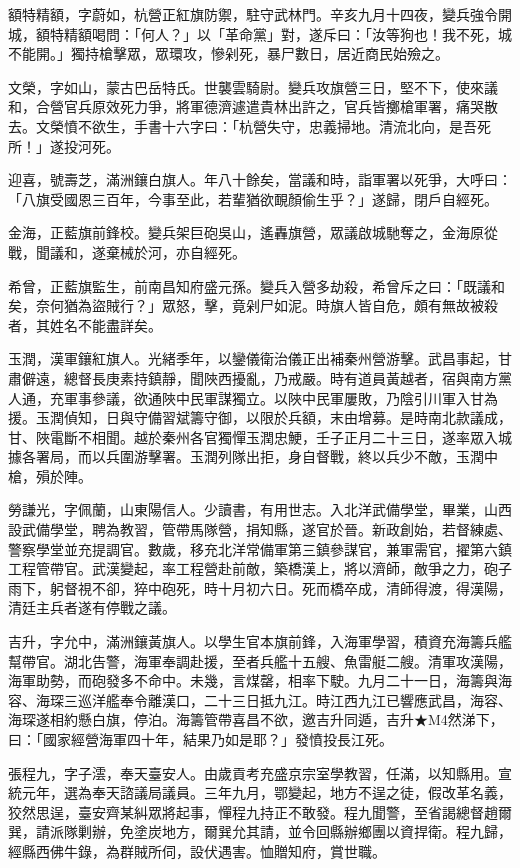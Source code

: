 \begin{pinyinscope}
額特精額，字蔚如，杭營正紅旗防禦，駐守武林門。辛亥九月十四夜，變兵強令開城，額特精額喝問：「何人？」以「革命黨」對，遂斥曰：「汝等狗也！我不死，城不能開。」獨持槍擊眾，眾環攻，慘剁死，暴尸數日，居近商民始殮之。

文榮，字如山，蒙古巴岳特氏。世襲雲騎尉。變兵攻旗營三日，堅不下，使來議和，合營官兵原效死力爭，將軍德濟遽遣貴林出許之，官兵皆擲槍軍署，痛哭散去。文榮憤不欲生，手書十六字曰：「杭營失守，忠義掃地。清流北向，是吾死所！」遂投河死。

迎喜，號壽芝，滿洲鑲白旗人。年八十餘矣，當議和時，詣軍署以死爭，大呼曰：「八旗受國恩三百年，今事至此，若輩猶欲靦顏偷生乎？」遂歸，閉戶自經死。

金海，正藍旗前鋒校。變兵架巨砲吳山，遙轟旗營，眾議啟城馳奪之，金海原從戰，聞議和，遂棄械於河，亦自經死。

希曾，正藍旗監生，前南昌知府盛元孫。變兵入營多劫殺，希曾斥之曰：「既議和矣，奈何猶為盜賊行？」眾怒，擊，竟剁尸如泥。時旗人皆自危，頗有無故被殺者，其姓名不能盡詳矣。

玉潤，漢軍鑲紅旗人。光緒季年，以鑾儀衛治儀正出補秦州營游擊。武昌事起，甘肅僻遠，總督長庚素持鎮靜，聞陜西擾亂，乃戒嚴。時有道員黃越者，宿與南方黨人通，充軍事參議，欲通陜中民軍謀獨立。以陜中民軍屢敗，乃陰引川軍入甘為援。玉潤偵知，日與守備習斌籌守御，以限於兵額，末由增募。是時南北款議成，甘、陜電斷不相聞。越於秦州各官獨憚玉潤忠鯁，壬子正月二十三日，遂率眾入城據各署局，而以兵圍游擊署。玉潤列隊出拒，身自督戰，終以兵少不敵，玉潤中槍，殞於陣。

勞謙光，字佩蘭，山東陽信人。少讀書，有用世志。入北洋武備學堂，畢業，山西設武備學堂，聘為教習，管帶馬隊營，捐知縣，遂官於晉。新政創始，若督練處、警察學堂並充提調官。數歲，移充北洋常備軍第三鎮參謀官，兼軍需官，擢第六鎮工程管帶官。武漢變起，率工程營赴前敵，築橋漢上，將以濟師，敵爭之力，砲子雨下，躬督視不卻，猝中砲死，時十月初六日。死而橋卒成，清師得渡，得漢陽，清廷主兵者遂有停戰之議。

吉升，字允中，滿洲鑲黃旗人。以學生官本旗前鋒，入海軍學習，積資充海籌兵艦幫帶官。湖北告警，海軍奉調赴援，至者兵艦十五艘、魚雷艇二艘。清軍攻漢陽，海軍助勢，而砲發多不命中。未幾，言煤罄，相率下駛。九月二十一日，海籌與海容、海琛三巡洋艦奉令離漢口，二十三日抵九江。時江西九江已響應武昌，海容、海琛遂相約懸白旗，停泊。海籌管帶喜昌不欲，邀吉升同遁，吉升★M4然涕下，曰：「國家經營海軍四十年，結果乃如是耶？」發憤投長江死。

張程九，字子澐，奉天臺安人。由歲貢考充盛京宗室學教習，任滿，以知縣用。宣統元年，選為奉天諮議局議員。三年九月，鄂變起，地方不逞之徒，假改革名義，狡然思逞，臺安齊某糾眾將起事，憚程九持正不敢發。程九聞警，至省謁總督趙爾巽，請派隊剿辦，免塗炭地方，爾巽允其請，並令回縣辦鄉團以資捍衛。程九歸，經縣西佛牛錄，為群賊所伺，設伏遇害。恤贈知府，賞世職。


\end{pinyinscope}
